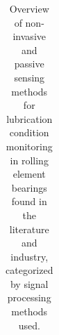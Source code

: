 \begin{table}[!h]
\begin{tabularx}{\linewidth}{| 
>{\raggedright\arraybackslash}p{2cm}
| X | X | X | X | X | X | X}
\end{tabularx}
\caption{Overview of non-invasive and passive sensing methods for lubrication condition monitoring in rolling element bearings found in the literature and industry, categorized by signal processing methods used.}
\label{tab:non-invasive_methods}
\end{table}